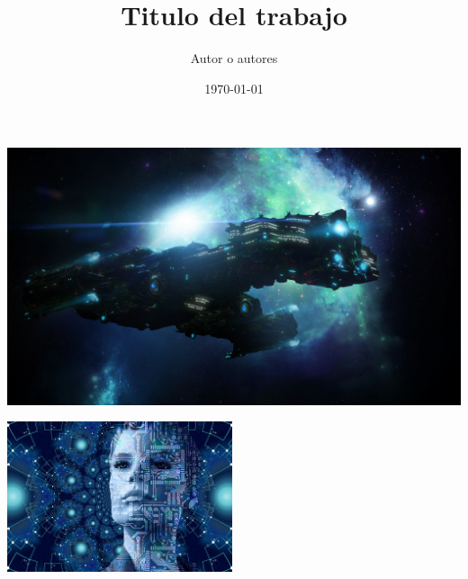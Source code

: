 \documentclass[
    a4paper,
    12pt
]{report}
\title{Titulo del trabajo}
\date{\today}
\author{Autor o autores}
\begin{document}
	\maketitle
	\begin{abstract}
		\lipsum[1-2]
	\end{abstract}


    \includegraphics[scale=0.2]{ship1}

        \includegraphics[width=250px]{tech1}
	
\end{document}
